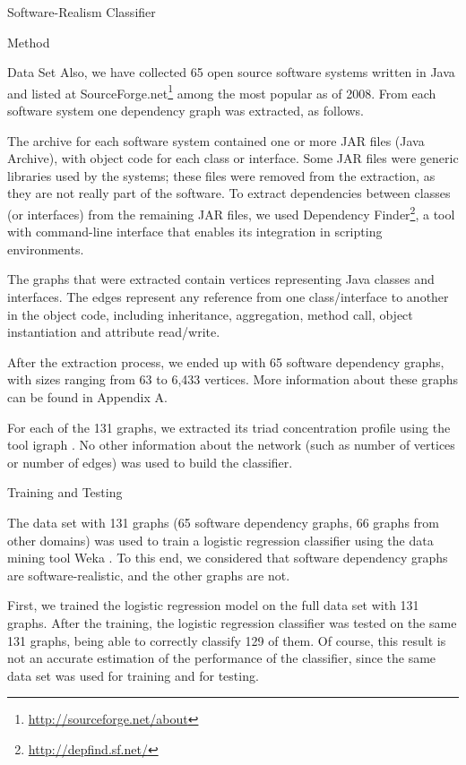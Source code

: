 \documentclass[11pt,twocolumn,a4paper,english]{article}
\begin{document}
\begin{section}{Software-Realism Classifier}
\begin{subsection}{Method}
\begin{subsubsection}{Data Set}
	Also, we have collected 65 open source software systems written in Java and listed at SourceForge.net\footnote{\url{http://sourceforge.net/about}} among the most popular as of 2008. From each software system one dependency graph was extracted, as follows.
	
	The archive for each software system contained one or more JAR files (Java Archive), with object code for each class or interface. Some JAR files were generic libraries used by the systems; these files were removed from the extraction, as they are not really part of the software.
To extract dependencies between classes (or interfaces) from the remaining JAR files, we used Dependency Finder\footnote{\url{http://depfind.sf.net/}}, a tool with command-line interface that enables its integration in scripting environments. %
	
	The graphs that were extracted contain vertices representing Java classes and interfaces. The edges represent any reference from one class/interface to another in the object code, including inheritance, aggregation, method call, object instantiation and attribute read/write.
	
	After the extraction process, we ended up with 65 software dependency graphs, with sizes ranging from 63 to 6,433 vertices. More information about these graphs can be found in Appendix A. %
	
	For each of the 131 graphs, we extracted its triad concentration profile using the tool igraph \cite{igraph}. No other information about the network (such as number of vertices or number of edges) was used to build the classifier.

\end{subsubsection}

\begin{subsubsection}{Training and Testing}
	
	The data set with 131 graphs (65 software dependency graphs, 66 graphs from other domains) was used to train a logistic regression classifier using the data mining tool Weka \cite{weka}. To this end, we considered that software dependency graphs are software-realistic, and the other graphs are not. 
		
	First, we trained the logistic regression model on the full data set with 131 graphs. After the training, the logistic regression classifier was tested on the same 131 graphs, being able to correctly classify 129 of them. Of course, this result is not an accurate estimation of the performance of the classifier, since the same data set was used for training and for testing.
	

\end{subsubsection}
\end{subsection}
\end{section}
\end{document}
